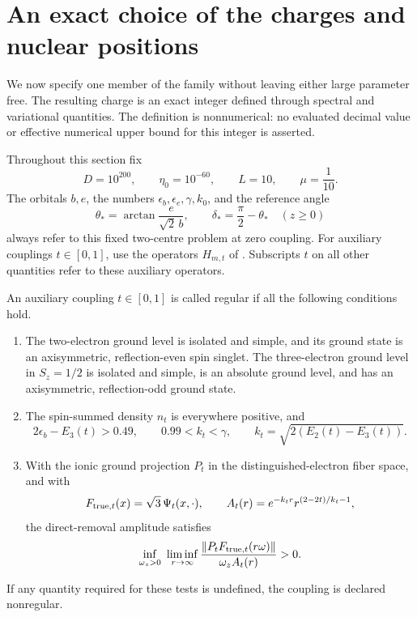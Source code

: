 \section{An exact choice of the charges and nuclear positions}
\label{sec:parameters}

We now specify one member of the family without leaving either
large parameter free.  The resulting charge is an exact integer
defined through spectral and variational quantities.
The definition is nonnumerical: no evaluated decimal value or
effective numerical upper bound for this integer is asserted.

Throughout this section fix
\begin{equation}
 D=10^{200},\qquad \eta_0=10^{-60},\qquad
 L=10,\qquad \mu=\frac1{10}.
 \label{eq:fixed-parameter-numbers}
\end{equation}
The orbitals \(b,e\), the numbers \(\epsilon_b,\epsilon_e,\gamma,k_0\),
and the reference angle
\[
 \theta_*=\arctan\frac{e}{\sqrt2\,b},\qquad
 \delta_*=\frac\pi2-\theta_*\quad(z\ge0)
\]
always refer to this fixed two-centre problem at zero coupling.
For auxiliary couplings \(t\in[0,1]\), use the operators
\(H_{m,t}\) of .
Subscripts \(t\) on all other quantities refer to these auxiliary
operators.

\begin{definition}
\label{def:regular-data}
An auxiliary coupling \(t\in[0,1]\) is called regular if all the
following conditions hold.
\begin{enumerate}[label=\textup{(\roman*)}]
\item The two-electron ground level is isolated and simple, and its
ground state is an axisymmetric, reflection-even spin singlet.
The three-electron ground level in \(S_z=1/2\) is isolated and
simple, is an absolute ground level, and has an axisymmetric,
reflection-odd ground state.
\item The spin-summed density \(n_t\) is everywhere positive, and
\begin{equation}
 2\epsilon_b-E_3(t)>0.49,\qquad 0.99<k_t<\gamma,
 \qquad k_t=\sqrt{2(E_2(t)-E_3(t))}.
 \label{eq:regular-energy-tests}
\end{equation}
\item With the ionic ground projection \(P_t\) in the
distinguished-electron fiber space, and with
\[
 F_{{\rm true},t}(x)=\sqrt3\,\Psi_t(x,\cdot),\qquad
 A_t(r)=e^{-k_t r}r^{(2-2t)/k_t-1},
\]
the direct-removal amplitude satisfies
\begin{equation}
 \inf_{\omega_z>0}\ \liminf_{r\to\infty}
 \frac{\|P_tF_{{\rm true},t}(r\omega)\|}
      {\omega_z A_t(r)}>0 .
 \label{eq:regular-amplitude-test}
\end{equation}
\end{enumerate}
If any quantity required for these tests is undefined, the coupling
is declared nonregular.
\end{definition}

